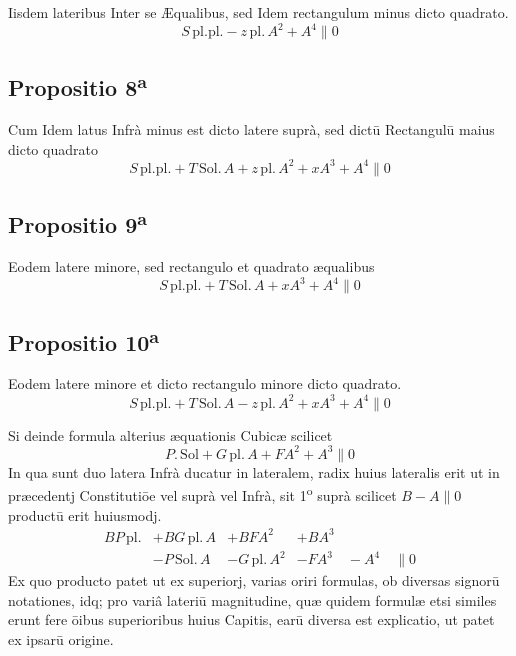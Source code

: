 \documentclass[11pt,a4paper]{article}
\begin{document}
Iisdem lateribus Inter se Æqualibus, sed Idem rectangulum minus dicto quadrato.
\[ S\,\mathrm{pl.pl.} - z\,\mathrm{pl.}\,A^{2} + A^{4} \parallel 0 \]

\subsection*{Propositio 8\textsuperscript{a}}

Cum Idem latus Infrà minus est dicto latere suprà, sed dictū Rectangulū maius dicto quadrato
\[ S\,\mathrm{pl.pl.} + T\,\mathrm{Sol.}\,A + z\,\mathrm{pl.}\,A^{2} + xA^{3} + A^{4} \parallel 0 \]

\subsection*{Propositio 9\textsuperscript{a}}

Eodem latere minore, sed rectangulo et quadrato æqualibus
\[ S\,\mathrm{pl.pl.} + T\,\mathrm{Sol.}\,A + xA^{3} + A^{4} \parallel 0 \]

\subsection*{Propositio 10\textsuperscript{a}}

Eodem latere minore et dicto rectangulo minore dicto quadrato.
\[ S\,\mathrm{pl.pl.} + T\,\mathrm{Sol.}\,A - z\,\mathrm{pl.}\,A^{2} + xA^{3} + A^{4} \parallel 0 \]

Si deinde formula alterius æquationis Cubicæ scilicet
\[ P.\,\mathrm{Sol} + G\,\mathrm{pl.}\,A + FA^{2} + A^{3} \parallel 0 \]
In qua sunt duo latera Infrà ducatur in lateralem, radix huius lateralis erit ut in præcedentj Constitutiōe vel suprà vel Infrà, sit 1\textsuperscript{o} suprà scilicet $B - A \parallel 0$ productū erit huiusmodj.
\[ \begin{array}{llll} BP\,\mathrm{pl.} & + BG\,\mathrm{pl.}\,A & + BFA^{2} & + BA^{3} \\ & - P\,\mathrm{Sol.}\,A & - G\,\mathrm{pl.}\,A^{2} & - FA^{3} \quad - A^{4} \quad \parallel 0 \end{array} \]
Ex quo producto patet ut ex superiorj, varias oriri formulas, ob diversas signorū notationes, idq; pro variâ lateriū magnitudine, quæ quidem formulæ etsi similes erunt fere ōibus superioribus huius Capitis, earū diversa est explicatio, ut patet ex ipsarū origine.
\end{document}

